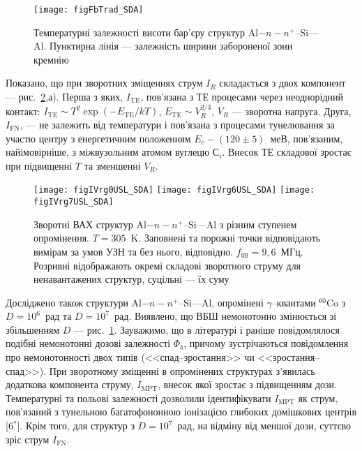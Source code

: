 \begin{figure}
\center
\texttt{[image: figFbTrad\_SDA]}
\caption{\label{figFbTrad_SDA}
Температурні залежності висоти бар'єру структур Al$-n-n^+$--Si---Al.
Пунктирна лінія --- залежність ширини забороненої зони кремнію
}%
\end{figure}

Показано, що при зворотних зміщеннях струм $I_R$ складається з двох компонент --- рис.~\ref{figIVrg0USL_SDA},а).
Перша з яких, $I_\mathrm{TE}$, пов'язана з ТЕ процесами через неоднорідний контакт:
$I_\mathrm{TE}\sim T^2\exp(-E_\mathrm{TE}/kT)$,
$E_\mathrm{TE}\sim V_R^{2/3}$,
$V_R$ --- зворотна напруга.
Друга, $I_\mathrm{FN}$, --- не залежить від температури і пов'язана з процесами тунелювання за участю
центру з енергетичним положенням $E_c-(120\pm5)$~меВ, пов'язаним, найімовірніше, з міжвузольним атомом вуглецю С$_i$.
Внесок ТЕ складової зростає при підвищенні $T$ та зменшенні $V_R$.

\begin{figure}[b]
\center
\texttt{[image: figIVrg0USL\_SDA]}\hfill
\texttt{[image: figIVrg6USL\_SDA]}\hfill
\texttt{[image: figIVrg7USL\_SDA]}
\caption{\label{figIVrg0USL_SDA}
Зворотні  ВАХ  структур Al$-n-n^+$--Si---Al з різним ступенем опромінення.
$T=305$~K.
Заповнені та порожні точки відповідають вимірам за умов УЗН та без нього, відповідно.
$f_\mathtt{US}=9,6$~МГц.
Розривні відображають окремі складові зворотного струму для ненавантажених структур,
суцільні --- їх суму
}%
\end{figure}

Досліджено також структури Al$-n-n^+$--Si---Al, опромінені $\gamma$--квантами $^{60}$Co з $D=10^6$~рад та $D=10^7$~рад.
Виявлено, що ВБШ немонотонно змінюється зі збільшенням $D$ --- рис.~\ref{figFbTrad_SDA}.
Зауважимо, що в літературі і раніше повідомлялося подібні немонотонні дозові залежності $\Phi_{b}$, причому зустрічаються повідомлення про немонотонності двох типів (<<спад--зростання>> чи <<зростання--спад>>).
При зворотному зміщенні в опромінених структурах з'явилась додаткова компонента струму, $I_\mathrm{MPT}$, внесок якої зростає з підвищенням дози.
Температурні та польові залежності дозволили ідентифікувати $I_\mathrm{MPT}$ як струм, пов'язаний з тунельною багатофононною іонізацією глибоких домішкових центрів
[6$^*$].
Крім того, для структур з $D=10^7$~рад, на відміну від меншої дози, суттєво зріс струм $I_\mathrm{FN}$.

